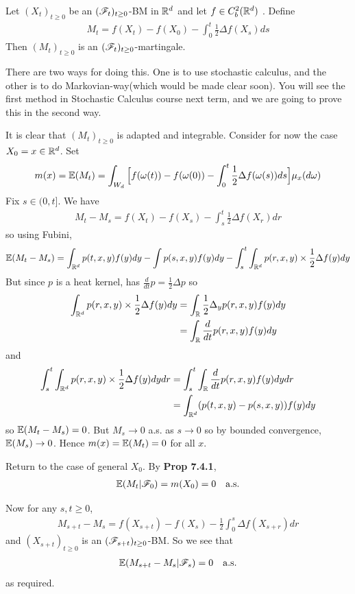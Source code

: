 \documentclass[12pt,a4paper]{report}
\newenvironment{proof}
{\begin{changemargin}{1cm}{0.5cm} 
	}%
	{\end{changemargin}
}
\begin{document}
 Let $(X_t)_{t\geq 0}$ be an $(\mathscr{F}_t)_{t\geq 0}$-BM in $\mathbb{R}^d$ and let $f\in C_b^2(\mathbb{R}^d)$ . Define
\begin{align*}
M_t = f(X_t) - f(X_0) - \int_0^t \frac{1}{2} \Delta f(X_s) ds
\end{align*}
Then $(M_t)_{t\geq 0}$ is an $(\mathscr{F}_t)_{t\geq 0}$-martingale.
\s

There are two ways for doing this. One is to use stochastic calculus, and the other is to do Markovian-way(which would be made clear soon). You will see the first method in Stochastic Calculus course next term, and we are going to prove this in the second way.
\begin{proof}
\pf It is clear that $(M_t)_{t\geq 0}$ is adapted and integrable. Consider for now the case $X_0 =x \in \mathbb{R}^d$. Set
\begin{align*}
m(x) = \mathbb{E}(M_t) = \int_{W_d} \Big[ f(\omega(t)) - f(\omega(0)) -\int_0^t \frac{1}{2} \Delta f(\omega(s)) ds \Big] \mu_x(d\omega) 
\end{align*}
Fix $s\in (0,t]$. We have
\begin{align*}
M_t - M_s = f(X_t) - f(X_s) - \int_s^t \frac{1}{2} \Delta f(X_r) dr
\end{align*}
so using Fubini,
\begin{align*}
\mathbb{E}(M_t - M_s) = \int_{\mathbb{R}^d} p(t,x,y)f(y)dy - \int p(s,x,y) f(y)dy - \int_s^t \int_{\mathbb{R}^d} p(r,x,y) \times \frac{1}{2}\Delta f(y) dy
\end{align*}
But since $p$ is a heat kernel, has $\frac{d}{dt}p = \frac{1}{2} \Delta p$ so
\begin{align*}
\int_{\mathbb{R}^d} p(r,x,y) \times \frac{1}{2} \Delta f(y) dy &= \int_{\mathbb{R}} \frac{1}{2} \Delta_y p(r,x,y) f(y) dy \\
&= \int_{\mathbb{R}} \frac{d}{dt} p(r,x,y) f(y) dy
\end{align*}
and
\begin{align*}
\int_s^t \int_{\mathbb{R}^d} p(r,x,y) \times \frac{1}{2} \Delta f(y) dy dr &= \int_s^t \int_{\mathbb{R}} \frac{d}{dt} p(r,x,y) f(y) dy dr \\
&= \int_{\mathbb{R}^d} (p(t,x,y) - p(s,x,y) ) f(y)dy
\end{align*}
so $\mathbb{E}(M_t -M_s) =0$. But $M_s \rightarrow 0$ a.s. as $s\rightarrow 0$ so by bounded convergence, $\mathbb{E}(M_s) \rightarrow 0$. Hence $m(x) = \mathbb{E}(M_t) =0$ for all $x$.

\quad Return to the case of general $X_0$. By \textbf{Prop 7.4.1},
\begin{align*}
\mathbb{E}(M_t | \mathscr{F}_0) = m(X_0) =0 \quad \text{a.s.}
\end{align*}
\s

Now for any $s,t\geq 0$,
\begin{align*}
M_{s+t} - M_s = f(X_{s+t}) - f(X_s) - \frac{1}{2}\int_0^s \Delta f(X_{s+r}) dr
\end{align*}
and $(X_{s+t})_{t\geq 0}$ is an $(\mathscr{F}_{s+t})_{t\geq 0}$-BM. So we see that 
\begin{align*}
\mathbb{E}(M_{s+t} - M_s | \mathscr{F}_s)  =0\quad \text{a.s.}
\end{align*}
as required.

\eop
\end{proof}
\end{document}
